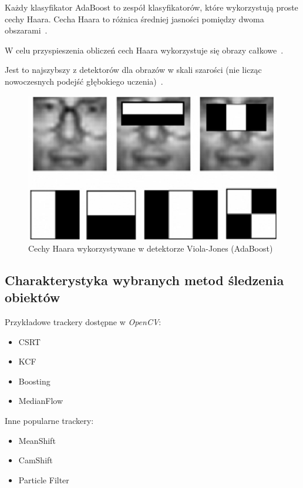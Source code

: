 \documentclass[wi]{zut}
\begin{document}
Każdy klasyfikator AdaBoost to zespół klasyfikatorów, które wykorzystują proste cechy Haara. Cecha Haara to różnica średniej jasności pomiędzy dwoma obszarami~\cite{ForczmanskiCV}.

W celu przyspieszenia obliczeń cech Haara wykorzystuje się obrazy całkowe~\cite{ForczmanskiCV}. 

Jest to najszybszy z detektorów dla obrazów w skali szarości (nie licząc nowoczesnych podejść głębokiego uczenia)~\cite{ForczmanskiCV}.

\begin{figure}[H]
    \centering
    \includegraphics[width=0.5\linewidth]{images/Haar-features-used-for-Viola-Jones-face-detection-method.png}
    \caption{Cechy Haara wykorzystywane w detektorze Viola-Jones (AdaBoost)}
    \label{fig:pdgd}
\end{figure}

\subsection{Charakterystyka wybranych metod śledzenia obiektów}

Przykładowe trackery dostępne w \textit{OpenCV}:

\begin{itemize}
    \item CSRT
    \item KCF
    \item Boosting
    \item MedianFlow
\end{itemize}

Inne popularne trackery:

\begin{itemize}
    \item MeanShift
    \item CamShift
    \item Particle Filter
\end{itemize}
\end{document}

